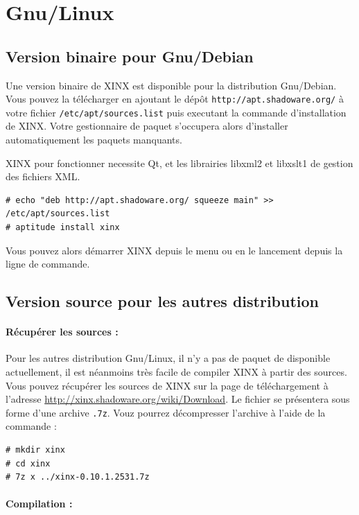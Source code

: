 \documentclass[a4paper,10pt,twoside]{book}
\begin{document}
\section{Gnu/Linux}

\subsection{Version binaire pour Gnu/Debian}

Une version binaire de XINX est disponible pour la distribution Gnu/Debian. Vous pouvez la télécharger en ajoutant le dépôt \verb+http://apt.shadoware.org/+ à votre fichier \verb+/etc/apt/sources.list+ puis executant la commande d'installation de XINX. Votre gestionnaire de paquet s'occupera alors d'installer automatiquement les paquets manquants. 

XINX pour fonctionner necessite Qt, et les librairies libxml2 et libxslt1 de gestion des fichiers XML.

\begin{verbatim}
# echo "deb http://apt.shadoware.org/ squeeze main" >> /etc/apt/sources.list
# aptitude install xinx
\end{verbatim}

Vous pouvez alors démarrer XINX depuis le menu ou en le lancement depuis la ligne de commande. 

\subsection{Version source pour les autres distribution}

\paragraph{Récupérer les sources :}

Pour les autres distribution Gnu/Linux, il n'y a pas de paquet de disponible actuellement, il est néanmoins très facile de compiler XINX à partir des sources. Vous pouvez récupérer les sources de XINX sur la page de téléchargement à l'adresse \url{http://xinx.shadoware.org/wiki/Download}. Le fichier se présentera sous forme d'une archive \verb+.7z+. Vouz pourrez décompresser l'archive à l'aide de la commande :

\begin{verbatim}
# mkdir xinx
# cd xinx
# 7z x ../xinx-0.10.1.2531.7z
\end{verbatim}

\paragraph{Compilation :}
\end{document}
